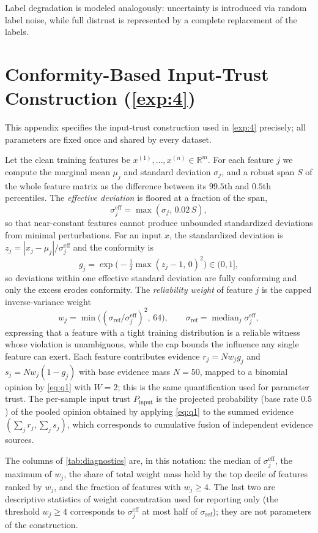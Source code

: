 Label degradation is modeled analogously: uncertainty is introduced via random label noise, while full distrust is represented by a complete replacement of the labels.

\section{Conformity-Based Input-Trust Construction (\cref{exp:4})}\label{app:conformity}
This appendix specifies the input-trust construction used in \cref{exp:4} precisely; all parameters are fixed once and shared by every dataset.

Let the clean training features be $x^{(1)},\dots,x^{(n)} \in \mathbb{R}^m$. For each feature $j$ we compute the marginal mean $\mu_j$ and standard deviation $\sigma_j$, and a robust span $S$ of the whole feature matrix as the difference between its $99.5$th and $0.5$th percentiles. The \emph{effective deviation} is floored at a fraction of the span,
\[
\sigma^{\mathrm{eff}}_j = \max(\sigma_j,\, 0.02\, S),
\]
so that near-constant features cannot produce unbounded standardized deviations from minimal perturbations. For an input $x$, the standardized deviation is $z_j = |x_j - \mu_j| / \sigma^{\mathrm{eff}}_j$ and the conformity is
\[
g_j = \exp\!\big(-\tfrac{1}{2}\max(z_j - 1,\, 0)^2\big) \in (0,1],
\]
so deviations within one effective standard deviation are fully conforming and only the excess erodes conformity. The \emph{reliability weight} of feature $j$ is the capped inverse-variance weight
\[
w_j = \min\!\big((\sigma_{\mathrm{ref}} / \sigma^{\mathrm{eff}}_j)^2,\, 64\big),
\qquad \sigma_{\mathrm{ref}} = \operatorname{median}_j \sigma^{\mathrm{eff}}_j,
\]
expressing that a feature with a tight training distribution is a reliable witness whose violation is unambiguous, while the cap bounds the influence any single feature can exert. Each feature contributes evidence $r_j = N w_j g_j$ and $s_j = N w_j (1-g_j)$ with base evidence mass $N = 50$, mapped to a binomial opinion by \cref{eq:q1} with $W = 2$; this is the same quantification used for parameter trust. The per-sample input trust $P_{\mathrm{input}}$ is the projected probability (base rate $0.5$) of the pooled opinion obtained by applying \cref{eq:q1} to the summed evidence $(\sum_j r_j, \sum_j s_j)$, which corresponds to cumulative fusion of independent evidence sources.

The columns of \cref{tab:diagnostics} are, in this notation: the median of $\sigma^{\mathrm{eff}}_j$, the maximum of $w_j$, the share of total weight mass held by the top decile of features ranked by $w_j$, and the fraction of features with $w_j \geq 4$. The last two are descriptive statistics of weight concentration used for reporting only (the threshold $w_j \geq 4$ corresponds to $\sigma^{\mathrm{eff}}_j$ at most half of $\sigma_{\mathrm{ref}}$); they are not parameters of the construction.

